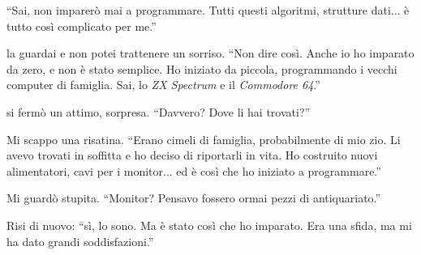 \begin{dialogue}
  \enquote{Sai, non imparerò mai a programmare. Tutti questi algoritmi, strutture dati... è tutto così complicato per me.}

 la guardai e non potei trattenere un sorriso. \enquote{Non dire così. Anche io ho imparato da zero, e non è stato semplice. Ho iniziato da piccola, programmando i vecchi computer di famiglia. Sai, lo \emph{ZX Spectrum} e il \emph{Commodore 64}.}

 si fermò un attimo, sorpresa. \enquote{Davvero? Dove li hai trovati?}

 Mi scappo una risatina. \enquote{Erano cimeli di famiglia, probabilmente di mio zio. Li avevo trovati in soffitta e ho deciso di riportarli in vita. Ho costruito nuovi alimentatori, cavi per i monitor... ed è così che ho iniziato a programmare.}

 Mi guardò  stupita. \enquote{Monitor? Pensavo fossero ormai pezzi di antiquariato.}

 Risi di nuovo: \enquote{sì, lo sono. Ma è stato così che ho imparato. Era una sfida, ma mi ha dato grandi soddisfazioni.}
\end{dialogue}



